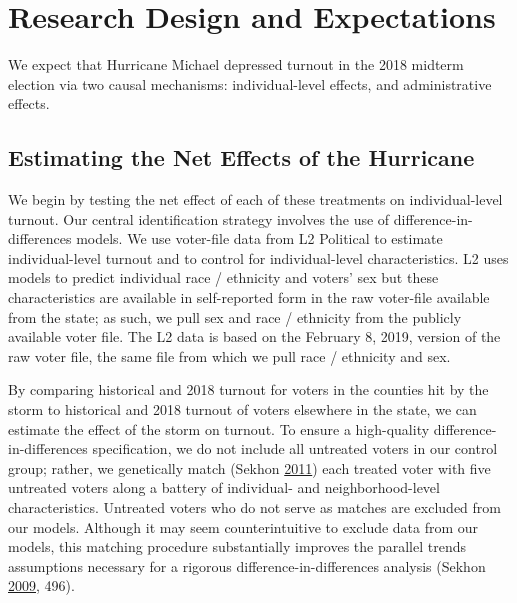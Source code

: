 \documentclass[
  12pt,
]{article}
\begin{document}
\hypertarget{research-design-and-expectations}{%
\section*{Research Design and Expectations}\label{research-design-and-expectations}}

We expect that Hurricane Michael depressed turnout in the 2018 midterm election via two causal mechanisms: individual-level effects, and administrative effects.

\hypertarget{estimating-the-net-effects-of-the-hurricane}{%
\subsection*{Estimating the Net Effects of the Hurricane}\label{estimating-the-net-effects-of-the-hurricane}}

We begin by testing the net effect of each of these treatments on individual-level turnout. Our central identification strategy involves the use of difference-in-differences models. We use voter-file data from L2 Political to estimate individual-level turnout and to control for individual-level characteristics. L2 uses models to predict individual race / ethnicity and voters' sex but these characteristics are available in self-reported form in the raw voter-file available from the state; as such, we pull sex and race / ethnicity from the publicly available voter file. The L2 data is based on the February 8, 2019, version of the raw voter file, the same file from which we pull race / ethnicity and sex.

By comparing historical and 2018 turnout for voters in the counties hit by the storm to historical and 2018 turnout of voters elsewhere in the state, we can estimate the effect of the storm on turnout. To ensure a high-quality difference-in-differences specification, we do not include all untreated voters in our control group; rather, we genetically match (Sekhon \protect\hyperlink{ref-Sekhon2011}{2011}) each treated voter with five untreated voters along a battery of individual- and neighborhood-level characteristics. Untreated voters who do not serve as matches are excluded from our models. Although it may seem counterintuitive to exclude data from our models, this matching procedure substantially improves the parallel trends assumptions necessary for a rigorous difference-in-differences analysis (Sekhon \protect\hyperlink{ref-Sekhon2009}{2009}, 496).
\end{document}
